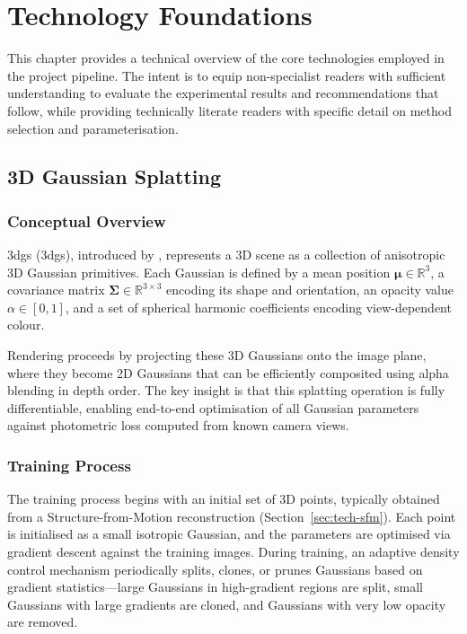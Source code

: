 \chapter{Technology Foundations}
\label{ch:technology}

This chapter provides a technical overview of the core technologies employed in the project pipeline. The intent is to equip non-specialist readers with sufficient understanding to evaluate the experimental results and recommendations that follow, while providing technically literate readers with specific detail on method selection and parameterisation.

\section{3D Gaussian Splatting}
\label{sec:tech-3dgs}

\subsection{Conceptual Overview}

\acrlong{3dgs} (\acrshort{3dgs}), introduced by \textcite{Kerbl2023}, represents a 3D scene as a collection of anisotropic 3D Gaussian primitives. Each Gaussian is defined by a mean position $\boldsymbol{\mu} \in \mathbb{R}^3$, a covariance matrix $\boldsymbol{\Sigma} \in \mathbb{R}^{3 \times 3}$ encoding its shape and orientation, an opacity value $\alpha \in [0,1]$, and a set of spherical harmonic coefficients encoding view-dependent colour.

Rendering proceeds by projecting these 3D Gaussians onto the image plane, where they become 2D Gaussians that can be efficiently composited using alpha blending in depth order. The key insight is that this splatting operation is fully differentiable, enabling end-to-end optimisation of all Gaussian parameters against photometric loss computed from known camera views.

\subsection{Training Process}

The training process begins with an initial set of 3D points, typically obtained from a Structure-from-Motion reconstruction (Section~\ref{sec:tech-sfm}). Each point is initialised as a small isotropic Gaussian, and the parameters are optimised via gradient descent against the training images. During training, an adaptive density control mechanism periodically splits, clones, or prunes Gaussians based on gradient statistics---large Gaussians in high-gradient regions are split, small Gaussians with large gradients are cloned, and Gaussians with very low opacity are removed.

